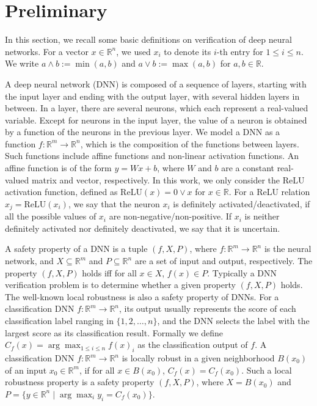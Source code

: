 \documentclass[runningheads]{llncs}
\begin{document}
\section{Preliminary}

In this section, we recall some basic definitions on verification of deep neural networks. For a vector $x \in \mathbb R^n$, we used $x_i$ to denote its $i$-th entry for $1 \le i \le n$. We write $a\wedge b:=\min(a,b)$ and $a\vee b:=\max(a,b)$ for $a,b \in \mathbb R$.

A deep neural network (DNN) is composed of a sequence of layers, starting with the input layer and ending with the output layer, with several hidden layers in between. 
In a layer, there are several neurons, which each represent a real-valued variable. 
Except for neurons in the input layer, the value of a neuron is obtained by a function of the neurons in the previous layer.
We model a DNN as a function $f:\mathbb R^m \to \mathbb R^n$, which is the composition of the functions between layers. Such functions include affine functions and non-linear activation functions. 
An affine function is of the form $y=Wx+b$, where $W$ and $b$ are a constant real-valued matrix and vector, respectively. 
In this work, we only consider the ReLU activation function, defined as $\mathrm{ReLU}(x)=0 \vee x$ for $x \in \mathbb R$. For a ReLU relation $x_j=\mathrm{ReLU}(x_i)$, we say that the neuron $x_i$ is definitely activated/deactivated, if all the possible values of $x_i$ are non-negative/non-positive. If $x_i$ is neither definitely activated nor definitely deactivated, we say that it is uncertain.

A safety property of a DNN is a tuple $(f,X,P)$, where $f:\mathbb R^m \to \mathbb R^n$ is the neural network, and $X \subseteq \mathbb R^m$ and $P \subseteq \mathbb R^n$ are a set of input and output, respectively. The property $(f,X,P)$ holds iff for all $x \in X$, $f(x) \in P$. Typically a DNN verification problem is to determine whether a given property $(f,X,P)$ holds.
The well-known local robustness is also a safety property of DNNs. For a classification DNN $f:\mathbb R^m \to \mathbb R^n$, its output usually represents the score of each classification label ranging in $\{1,2,\ldots,n\}$, and the DNN selects the label with the largest score as its classification result. Formally we define $C_f(x)=\arg \max_{1 \le i \le n} f(x)_i$ as the classification output of $f$. A classification DNN $f:\mathbb R^m \to \mathbb R^n$ is locally robust in a given neighborhood $B(x_0)$ of an input $x_0 \in \mathbb R^m$, if for all $x \in B(x_0)$, $C_f(x)=C_f(x_0)$. Such a local robustness property is a safety property $(f,X,P)$, where $X=B(x_0)$ and $P=\{y \in \mathbb R^n \mid \arg \max_i y_i=C_f(x_0)\}$.
\end{document}
